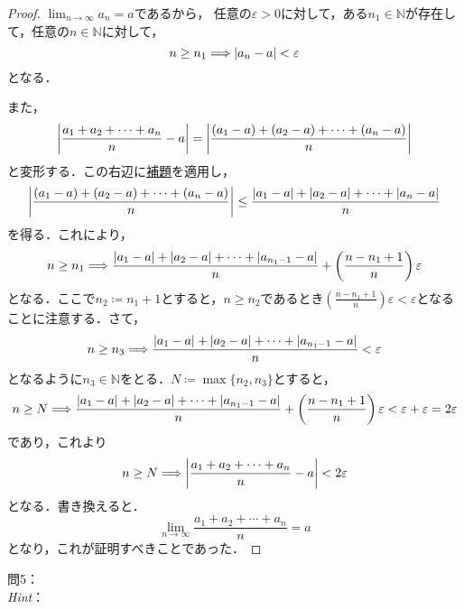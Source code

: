 \documentclass[dvipdfmx,uplatex,11pt]{jsarticle}
\DeclarePairedDelimiter\abs{\lvert}{\rvert}
\theoremstyle{definition}
\begin{document}
\newpage 
\begin{leftbar}
    \begin{proof}
    $\lim_{n \to \infty} a_n =a$であるから，
    任意の$\varepsilon >0$に対して，ある$n_1 \in \mathbb{N}$が存在して，任意の$n \in \mathbb{N}$に対して，
    \[
        n \ge n_1 \Longrightarrow \abs{a_n -a}<\varepsilon 
    \]
    となる．

    また，
    \[
        \abs*{\frac{a_1+a_2+\cdots+a_n}{n}-a}= \abs*{\frac{(a_1-a)+(a_2-a)+\cdots+(a_n-a)}{n}}
    \]
    と変形する．この右辺に\hyperref[lem:三角不等式の拡張]{補題}を適用し，
    \[
        \abs*{\frac{(a_1-a)+(a_2-a)+\cdots+(a_n-a)}{n}} \le \frac{\abs{a_1-a}+\abs{a_2-a}+\cdots+\abs{a_n-a}}{n}
    \]
    を得る．これにより，
    \[
        n \ge n_1 \Longrightarrow \frac{\abs{a_1-a}+\abs{a_2-a}+\cdots+\abs{a_{n_1-1}-a}}{n} +\left( \frac{n-n_1+1}{n} \right ) \varepsilon 
    \]
    となる．ここで$n_2 \coloneqq n_1 +1$とすると，$n \ge n_2$であるとき$\left( \frac{n-n_1+1}{n} \right ) \varepsilon < \varepsilon$となることに注意する．さて，
    \[
        n \ge n_3 \Longrightarrow \frac{\abs{a_1-a}+\abs{a_2-a}+\cdots+\abs{a_{n_1-1}-a}}{n}<\varepsilon
    \]
    となるように$n_3 \in \mathbb{N}$をとる．$N \coloneqq \max \{n_2 , n_3\}$とすると，
    \[
        n \ge N \Longrightarrow \frac{\abs{a_1-a}+\abs{a_2-a}+\cdots+\abs{a_{n_1-1}-a}}{n} +\left( \frac{n-n_1+1}{n} \right ) \varepsilon < \varepsilon + \varepsilon = 2 \varepsilon
    \]
    であり，これより
    \[
        n \ge N \Longrightarrow \abs*{\frac{a_1+a_2+\cdots+a_n}{n}-a} < 2 \varepsilon
    \]
    となる．書き換えると．
    \[
        \lim_{n \to \infty} \frac{a_1+a_2+\cdots+a_n}{n}=a
    \]
    となり，これが証明すべきことであった．
    \end{proof}
\end{leftbar}
%
\newpage
%
\setcounter{equation}{0}
\noindent
問5：
\\
\textsl{Hint}：\\
\dotfill
%
% 
%
\end{document}
